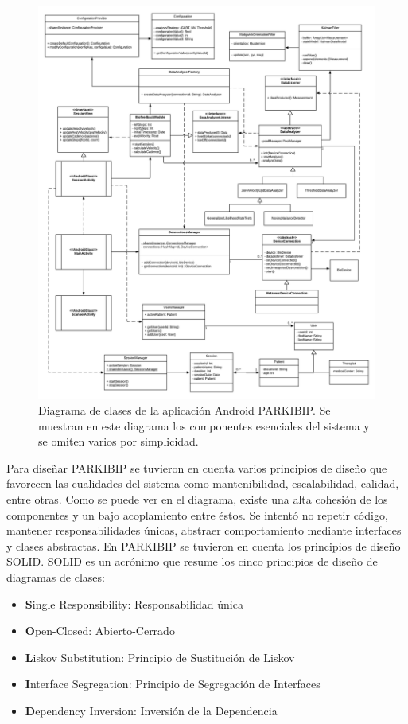 \begin{figure}[H]
    \hspace*{-2.0cm}%
    \includegraphics[clip,width=1.25 \columnwidth]{TESIS/imagenes/chap05/Parkibip-Design.png}
    \caption{Diagrama de clases de la aplicación Android PARKIBIP. Se muestran en este diagrama los componentes esenciales del sistema y se omiten varios por simplicidad.}
    \label{FIG:class-diagram-design}
\end{figure}

Para diseñar PARKIBIP se tuvieron en cuenta varios principios de diseño que favorecen las cualidades del sistema como mantenibilidad, escalabilidad, calidad, entre otras. Como se puede ver en el diagrama, existe una alta cohesión de los componentes y un bajo acoplamiento entre éstos. Se intentó no repetir código, mantener responsabilidades únicas, abstraer comportamiento mediante interfaces y clases abstractas. En PARKIBIP se tuvieron en cuenta los principios de diseño SOLID. SOLID es un acrónimo que resume los cinco principios de diseño de diagramas de clases\cite{Chebanyuk2016}:

\begin{itemize}
    \item \textbf{S}ingle Responsibility: Responsabilidad única
    \item \textbf{O}pen-Closed: Abierto-Cerrado
    \item \textbf{L}iskov Substitution: Principio de Sustitución de Liskov
    \item \textbf{I}nterface Segregation: Principio de Segregación de Interfaces
    \item \textbf{D}ependency Inversion: Inversión de la Dependencia 
\end{itemize}

